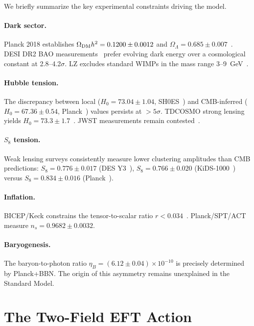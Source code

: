 \documentclass[a4paper,11pt]{article}
\newcommand{\etaB}{\eta_B}
\newcommand{\e}[1]{\times 10^{#1}}
\begin{document}
We briefly summarize the key experimental constraints driving the model.

\paragraph{Dark sector.} Planck 2018 establishes $\Omega_{\rm DM} h^2 = 0.1200 \pm 0.0012$ and $\Omega_\Lambda = 0.685 \pm 0.007$~\cite{Planck2018}. DESI DR2 BAO measurements~\cite{DESI2025} prefer evolving dark energy over a cosmological constant at 2.8--4.2$\sigma$. LZ excludes standard WIMPs in the mass range 3--9~GeV~\cite{LZ2025}.

\paragraph{Hubble tension.} The discrepancy between local ($H_0 = 73.04 \pm 1.04$, SH0ES~\cite{Riess2022}) and CMB-inferred ($H_0 = 67.36 \pm 0.54$, Planck~\cite{Planck2018}) values persists at $>5\sigma$. TDCOSMO strong lensing yields $H_0 = 73.3 \pm 1.7$~\cite{TDCOSMO}. JWST measurements remain contested~\cite{Freedman2025}.

\paragraph{$S_8$ tension.} Weak lensing surveys consistently measure lower clustering amplitudes than CMB predictions: $S_8 = 0.776 \pm 0.017$ (DES Y3~\cite{DESY3}), $S_8 = 0.766 \pm 0.020$ (KiDS-1000~\cite{KiDS}) versus $S_8 = 0.834 \pm 0.016$ (Planck~\cite{Planck2018}).

\paragraph{Inflation.} BICEP/Keck constrains the tensor-to-scalar ratio $r < 0.034$~\cite{BICEP}. Planck/SPT/ACT measure $n_s = 0.9682 \pm 0.0032$.

\paragraph{Baryogenesis.} The baryon-to-photon ratio $\etaB = (6.12 \pm 0.04) \e{-10}$ is precisely determined by Planck+BBN. The origin of this asymmetry remains unexplained in the Standard Model.


\section{The Two-Field EFT Action}
\label{sec:action}
\end{document}
